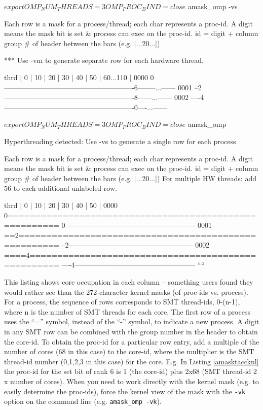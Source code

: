 \documentclass[10pt,a4paper]{report}
\begin{document}
\begin{smallercode}[frame=single,breaklines=true,numbers=left,language=C,caption=Process masks for an 8-thread execution on 68-core KNL\label{amasktaccknl}]

$ export OMP_NUM_THREADS=3 OMP_PROC_BIND=close
$ amask_omp -vs

     Each row is a mask for a process/thread; each char represents a proc-id.
     A digit means the mask bit is set & process can exec on the proc-id.
     id = digit + column group # of header between the bars (e.g. |...20...|)

      *** Use -vm to generate separate row for each hardware thread.

thrd |    0    |   10    |   20    |   30    |   40    |   50    |  60...110 |
0000 0-------------------------------------------------------6--------...------
0001 --2-------------------------------------------------------8------...------
0002 ----4-------------------------------------------------------0----...------

$ export OMP_NUM_THREADS=3 OMP_PROC_BIND=close
$ amask_omp

     Hyperthreading detected: Use -vs to generate a single row for each process

     Each row is a mask for a process/thread; each char represents a proc-id.
     A digit means the mask bit is set & process can exec on the proc-id.
     id = digit + column group # of header between the bars (e.g. |...20...|)
     For multiple HW threads: add 56 to each additional unlabeled row.

thrd |    0    |   10    |   20    |   30    |   40    |   50    |   
0000 0=======================================================
     0-------------------------------------------------------
0001 ==2=====================================================
     --2-----------------------------------------------------
0002 ====4===================================================
     ----4---------------------------------------------------
````

\end{smallercode}

This listing shows core occupation in each column -- something users found they would rather see than the 272-character kernel masks (of proc-ids vs. process).
For a process, the sequence of rows corresponds to SMT thread-ids, 0-(n-1), where n is the number of SMT threads for each core. 
The first row of a process uses the ``='' symbol, instead of the ``-'' symbol, to indicate a new process.
A digit in any SMT row can be combined with the group number in the header to obtain the core-id. 
To obtain the proc-id for a particular row entry, add a multiple of the number of cores (68 in this case)
to the core-id, where the multiplier is the SMT thread-id number (0,1,2,3 in this case) for the core.  
E.g. In Listing \ref{amasktaccknl} the proc-id for the set bit of rank 6 is 1 (the core-id) plus 2x68 (SMT thread-id 2 x number of cores). 
When you need to work directly with the kernel mask (e.g. to easily determine the proc-ids), 
force the kernel view of the mask with the \verb+-vk+ option on the command line (e.g. \verb+amask_omp -vk+). 
\end{document}
